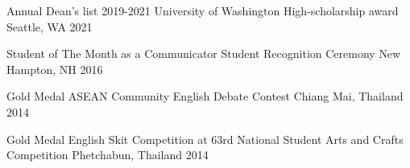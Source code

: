 
\begin{cvhonors}

  \cvhonor
    {Annual Dean's list 2019-2021} %
    {University of Washington High-scholarship award} %
    {Seattle, WA} %
    {2021} %

  \cvhonor
    {Student of The Month as a Communicator} %
    {Student Recognition Ceremony} %
    {New Hampton, NH} %
    {2016} %

  \cvhonor
    {Gold Medal} %
    {ASEAN Community English Debate Contest} %
    {Chiang Mai, Thailand} %
    {2014} %


  \cvhonor
    {Gold Medal} %
    {English Skit Competition at 63rd National Student Arts and Crafts Competition} %
    {Phetchabun, Thailand} %
    {2014} %

\end{cvhonors}
